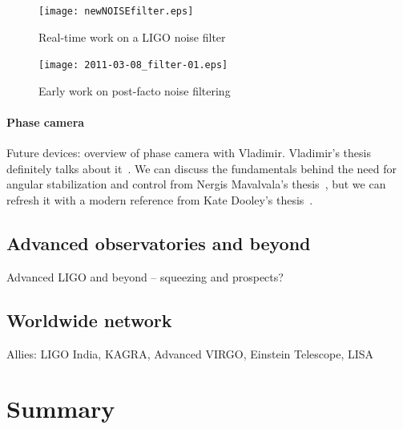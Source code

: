 	\begin{figure}
	\begin{center}
	\texttt{[image: newNOISEfilter.eps]}
	\caption{Real-time work on a LIGO noise filter}
	\label{newNOISEfilter}
	\end{center}
	\end{figure}

	\begin{figure}
	\begin{center}
	\texttt{[image: 2011-03-08\_filter-01.eps]}
	\caption{Early work on post-facto noise filtering}
	\label{filter_early}
	\end{center}
	\end{figure}

                \paragraph{Phase camera}
                \label{phase_camera}

                    Future devices: overview of phase camera with Vladimir. Vladimir's thesis definitely talks about it~\cite{DergachevThesis}. We can discuss the fundamentals behind the need for angular stabilization and control from Nergis Mavalvala's thesis~\cite{MavalvalaThesis}, but we can refresh it with a modern reference from Kate Dooley's thesis~\cite{DooleyThesis}.


        \subsection{Advanced observatories and beyond}
        \label{advanced}
  
            Advanced LIGO and beyond -- squeezing and prospects?

        \subsection{Worldwide network}
        \label{worldwide}
 
            Allies: LIGO India, KAGRA, Advanced VIRGO, Einstein Telescope, LISA

    \section{Summary}
    \label{intro_summary}
 

